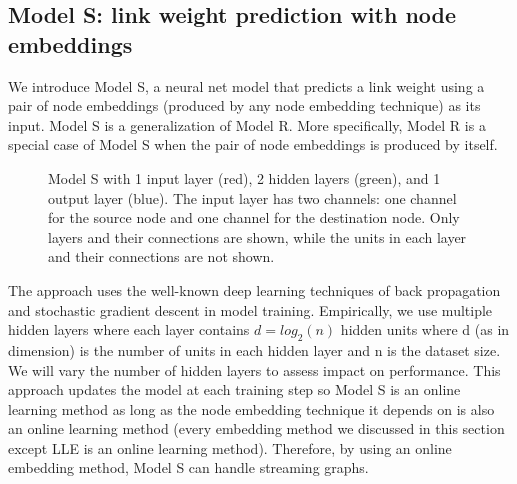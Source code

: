 \documentclass[12pt]{WSUThesis}
\theoremstyle{definition}
\begin{document}
\subsection{Model S: link weight prediction with node embeddings}
We introduce Model S, a neural net model that predicts a link weight using a pair of node embeddings (produced by any node embedding technique) as its input.
Model S is a generalization of Model R. More specifically, Model R is a special case of Model S when the pair of node embeddings is produced by itself.
\begin{figure}[ht]\centering
	\newcommand{\layersep}{1cm}
	\caption{
		Model S with 1 input layer (red), 2 hidden layers (green), and 1 output layer (blue).
		The input layer has two channels: one channel for the source node and one channel for the destination node.
		Only layers and their connections are shown,
		while the units in each layer and their connections are not shown.
	}
	\label{fig:model-s}
\end{figure}

The approach uses the well-known deep learning techniques of back propagation \citep{rumelhart1988learning} and stochastic gradient descent \citep{lecun2012efficient} in model training.
Empirically, we use multiple hidden layers where each layer contains $ d = log_2(n) $ hidden units where d (as in dimension) is the number of units in each hidden layer and n is the dataset size.
We will vary the number of hidden layers to assess impact on performance.
This approach updates the model at each training step so Model S is an online learning method as long as the node embedding technique it depends on is also an online learning method (every embedding method we discussed in this section except LLE is an online learning method).
Therefore, by using an online embedding method, Model S can handle streaming graphs.
\end{document}
